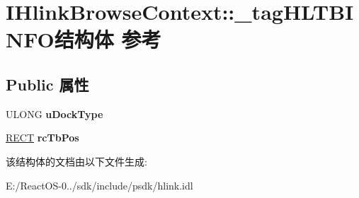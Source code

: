 \hypertarget{struct_i_hlink_browse_context_1_1__tag_h_l_t_b_i_n_f_o}{}\section{I\+Hlink\+Browse\+Context\+:\+:\+\_\+tag\+H\+L\+T\+B\+I\+N\+F\+O结构体 参考}
\label{struct_i_hlink_browse_context_1_1__tag_h_l_t_b_i_n_f_o}
\subsection*{Public 属性}
\begin{DoxyCompactItemize}
\item 
\mbox{\label{struct_i_hlink_browse_context_1_1__tag_h_l_t_b_i_n_f_o_af581b7b1a222154805eba0dd19586d17}} 
U\+L\+O\+NG {\bfseries u\+Dock\+Type}
\item 
\mbox{\label{struct_i_hlink_browse_context_1_1__tag_h_l_t_b_i_n_f_o_a50a5325e0a84ec40d8278cfbb4274cda}} 
\hyperlink{structtag_r_e_c_t}{R\+E\+CT} {\bfseries rc\+Tb\+Pos}
\end{DoxyCompactItemize}


该结构体的文档由以下文件生成\+:\begin{DoxyCompactItemize}
\item 
E\+:/\+React\+O\+S-\/0../sdk/include/psdk/hlink.\+idl\end{DoxyCompactItemize}

